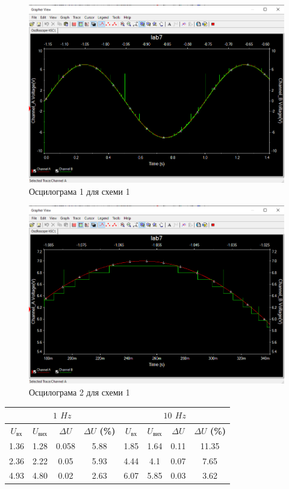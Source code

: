 \documentclass{article}
\begin{document}
\begin{normalsize}
	\begin{figure}[H]
		\centering
		\includegraphics[width=\textwidth]{2}
		\caption{Осцилограма 1 для схеми 1}
	\end{figure}

	\begin{figure}[H]
		\centering
		\includegraphics[width=\textwidth]{3}
		\caption{Осцилограма 2 для схеми 1}
	\end{figure}

	\begin{table}[H]
		\centering
		\renewcommand*\arraystretch{1.3}
		\begin{tabular}{|c|c|c|c|c|c|c|c|}
			\hline
			\multicolumn{4}{|c|}{\textbf{$1$ $Hz$}} & \multicolumn{4}{c|}{\textbf{$10$ $Hz$}} \\
			\hline
			\textbf{$U_{\text{вх}}$} & \textbf{$U_{\text{вих}}$} & \textbf{$\Delta U$} & \textbf{$\Delta U$ (\%)} & \textbf{$U_{\text{вх}}$} & \textbf{$U_{\text{вих}}$} & \textbf{$\Delta U$} & \textbf{$\Delta U$ (\%)} \\
			\hline
			1.36&1.28&0.058&5.88&1.85&1.64&0.11&11.35\\
			\hline
			2.36&2.22&0.05&5.93&4.44&4.1&0.07&7.65\\
			\hline
			4.93&4.80&0.02&2.63&6.07&5.85&0.03&3.62\\
			\hline
		\end{tabular}
	\end{table}


\end{normalsize}
\end{document}
